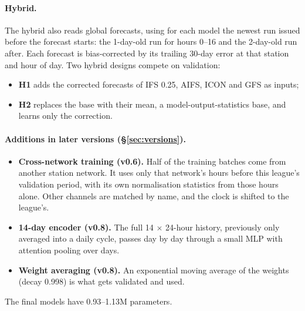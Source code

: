 \paragraph{Hybrid.}
The hybrid also reads global forecasts, using for each model the newest run issued before the forecast starts: the
1-day-old run for hours 0--16 and the 2-day-old run after. Each forecast is bias-corrected by its trailing 30-day
error at that station and hour of day. Two hybrid designs compete on validation:
\begin{itemize}
\item \textbf{H1} adds the corrected forecasts of IFS 0.25, AIFS, ICON and GFS as inputs;
\item \textbf{H2} replaces the base with their mean, a model-output-statistics base, and learns only the correction.
\end{itemize}

\paragraph{Additions in later versions (\S\ref{sec:versions}).}
\begin{itemize}
\item \textbf{Cross-network training (v0.6).} Half of the training batches come from another station network. It uses only
that network's hours before this league's validation period, with its own normalisation statistics from those hours
alone. Other channels are matched by name, and the clock is shifted to the league's.
\item \textbf{14-day encoder (v0.8).} The full 14 $\times$ 24-hour history, previously only averaged into a daily
cycle, passes day by day through a small MLP with attention pooling over days.
\item \textbf{Weight averaging (v0.8).} An exponential moving average of the weights (decay 0.998) is what gets
validated and used.
\end{itemize}
The final models have 0.93--1.13M parameters.
